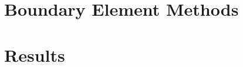 \documentclass[twoside, 12pt]{report}
\begin{document}
\chapter{Boundary Element Methods}\label{chap:bemethod}


\chapter{Results}\label{chap:results}


\cleardoublepage %



\nocite{*}

%
\end{document}
